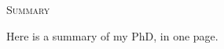 
\newevenside
\begin{center}
\fontsize{29}{29}\scshape Summary\\[1cm]
\end{center}
Here is a summary of my PhD, in one page.